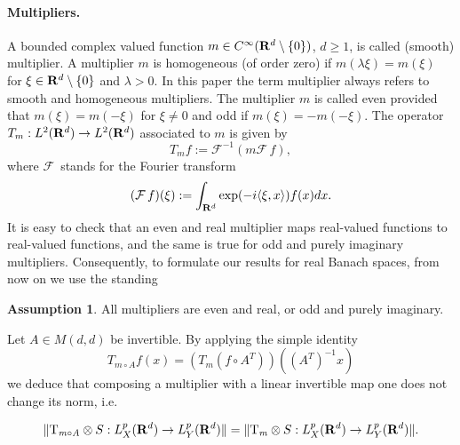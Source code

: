 \documentclass[11pt,a4paper,twoside,draft]{amsart}
\theoremstyle{definition}
\newtheorem{assumption}[lemma]{Assumption}
\newcommand{\real}{{\bf R}}
\newcommand{\smooth}{C^\infty}
\newcommand{\F}{{\mathcal F}\, }
\newcommand{\FI}{{\mathcal F}^{-1}}
\begin{document}
\paragraph{{\bf Multipliers}.}
A bounded complex valued function $m\in \smooth (\real^d\setminus \{ 0\})$,
$d\ge 1$, is called (smooth) multiplier. A multiplier $m$ is homogeneous 
(of order zero) if $m(\lambda \xi )=m(\xi )$ for $\xi\in\real^d\setminus \{ 0\}$ 
and $\lambda >0$.
In this paper the term multiplier always refers to smooth and homogeneous multipliers. 
The multiplier $m$ is called even provided that $m(\xi )=m(-\xi )$ for 
$\xi\not =0$ and odd if $m(\xi )=-m(-\xi )$.
The operator $T_m:L^2(\real^d) \rightarrow L^2(\real^d)$ associated to $m$ 
is given by
\[ T_mf := \FI (m\F f), \]
where $\F$ stands for the Fourier transform
\[ (\F f)(\xi):=\int_{\real^d} \exp(-i\langle \xi,x \rangle) f(x) dx. \]
It is easy to check that an even and real multiplier maps real-valued 
functions to real-valued functions, and the same is true for odd and purely
imaginary multipliers. Consequently, to formulate our results for real Banach 
spaces, from now on we use the standing 
\begin{assumption}\label{assumption:m}\rm
All multipliers are even and real, or odd and purely imaginary.
\end{assumption}

Let $A\in M(d,d)$ be invertible. By applying the simple identity
\[ T_{m\circ A}f(x) = (T_m(f\circ A^T))\left ((A^{T})^{-1}x\right ) \]
we deduce that composing a multiplier with a linear invertible 
map one does not change its norm, i.e.

\begin{equation}
\label{eq:2.10}
  \|{\rm T_{\it m\circ A}} \otimes S:L^p_X(\real^d) \rightarrow L^p_Y(\real^d)\|
= \|{\rm T_{\it m}       } \otimes S:L^p_X(\real^d) \rightarrow L^p_Y(\real^d)\|.
\end{equation}
\end{document}
